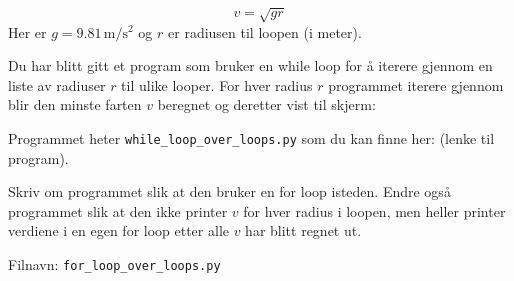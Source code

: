 \documentclass[10pt,a4paper]{article}
\begin{document}
\[
v = \sqrt{gr}
\]
Her er $g = 9.81\,\mathrm{m/s^2}$ og $r$ er radiusen til loopen (i meter). 
 
 
Du har blitt gitt et program som bruker en while loop for å iterere gjennom en liste av radiuser $r$ til ulike looper. For hver radius $r$ programmet iterere gjennom blir den minste farten $v$ beregnet og deretter vist til skjerm:

Programmet heter \texttt{while\_loop\_over\_loops.py} som du kan finne her: (lenke til program).
 
Skriv om programmet slik at den bruker en for loop isteden. Endre også programmet slik at den ikke printer $v$ for hver radius i loopen, men heller printer verdiene i en egen for loop etter alle $v$ har blitt regnet ut. 
 
Filnavn: \texttt{for\_loop\_over\_loops.py}
 
\end{document}
